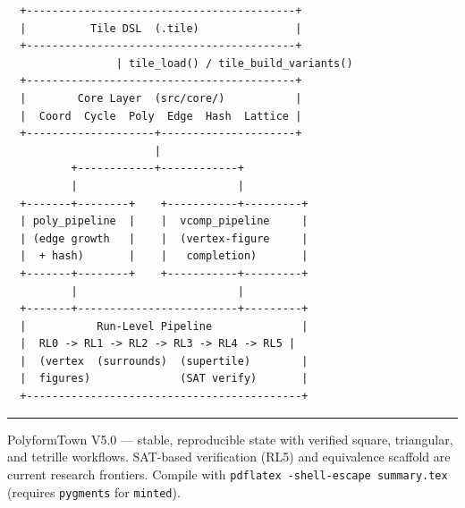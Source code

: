\documentclass[10pt,a4paper]{article}
\begin{document}
\begin{center}
\begin{tcolorbox}[
  colframe=rulecolor, colback=white, boxrule=0.6pt, arc=3pt,
  width=0.96\linewidth
]
\begin{verbatim}
  +------------------------------------------+
  |          Tile DSL  (.tile)               |
  +------------------------------------------+
                 | tile_load() / tile_build_variants()
  +------------------------------------------+
  |        Core Layer  (src/core/)           |
  |  Coord  Cycle  Poly  Edge  Hash  Lattice |
  +--------------------+---------------------+
                       |
          +------------+------------+
          |                         |
  +-------+--------+    +-----------+---------+
  | poly_pipeline  |    |  vcomp_pipeline     |
  | (edge growth   |    |  (vertex-figure     |
  |  + hash)       |    |   completion)       |
  +-------+--------+    +-----------+---------+
          |                         |
  +-------+-------------------------+---------+
  |           Run-Level Pipeline              |
  |  RL0 -> RL1 -> RL2 -> RL3 -> RL4 -> RL5 |
  |  (vertex  (surrounds)  (supertile)        |
  |  figures)              (SAT verify)       |
  +-------------------------------------------+
\end{verbatim}
\end{tcolorbox}
\end{center}

\vspace{4pt}
\noindent\rule{\linewidth}{0.6pt}
\vspace{2pt}

{\small\color{gray}
PolyformTown V5.0 — stable, reproducible state with verified square,
triangular, and tetrille workflows.  SAT-based verification (RL5)
and equivalence scaffold are current research frontiers.
Compile with \texttt{pdflatex -shell-escape summary.tex} (requires
\texttt{pygments} for \texttt{minted}).
}
\end{document}
